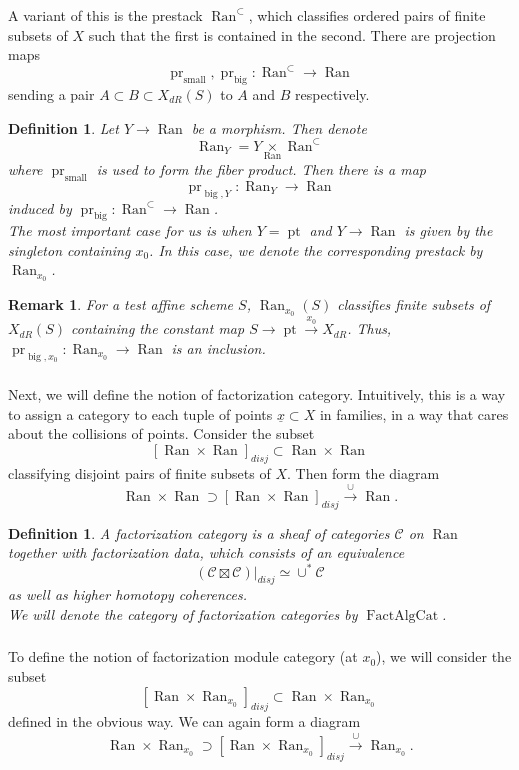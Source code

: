 \documentclass[10pt,a4paper]{amsart}
\newtheorem{defn}[subsubsection]{Definition}
\newtheorem{rem}[subsubsection]{Remark}
\newcommand{\on}[1]{\operatorname{#1}}
\newcommand{\Ran}{\on{Ran}}
\newcommand{\FactAlgCat}{\on{FactAlgCat}}
\newcommand{\sssec}[1]{\subsubsection{}}
\begin{document}
\sssec{}
A variant of this is the prestack $\Ran^{\subset}$, which classifies ordered pairs of finite subsets of $X$ such that the first is contained in the second. There are projection maps
$$
\on{pr}_{\on{small}}, \on{pr}_{\on{big}}: \Ran^{\subset} \longrightarrow \Ran
$$
sending a pair $A \subset B \subset X_{dR}(S)$ to $A$ and $B$ respectively.

\begin{defn}
    Let $Y \to \Ran$ be a morphism. Then denote
    $$
    \Ran_Y = Y \underset{\Ran}{\times} \Ran^{\subset}
    $$
    where $\on{pr}_{\on{small}}$ is used to form the fiber product. Then there is a map
    $$
    \on{pr}_{\on{big}, Y} : \Ran_Y \longrightarrow \Ran
    $$
    induced by $\on{pr}_{\on{big}} : \Ran^{\subset} \to \Ran$.
    \\
    The most important case for us is when $Y = \on{pt}$ and $Y \to \Ran$ is given by the singleton containing $x_0$. In this case, we denote the corresponding prestack by $\Ran_{x_0}$.
\end{defn}

\begin{rem}
    For a test affine scheme $S$, $\Ran_{x_0}(S)$ classifies finite subsets of $X_{dR}(S)$ containing the constant map $S \to \on{pt} \overset{x_0}{\to} X_{dR}$. Thus, $\on{pr}_{\on{big}, x_0} : \Ran_{x_0} \to \Ran$ is an inclusion.
\end{rem}

\sssec{}
Next, we will define the notion of factorization category. Intuitively, this is a way to assign a category to each tuple of points $\underline{x} \subset X$ in families, in a way that cares about the collisions of points. Consider the subset
$$
    [\Ran \times \Ran]_{disj} \subset \Ran \times \Ran
$$
classifying disjoint pairs of finite subsets of $X$. Then form the diagram
$$
\Ran \times \Ran \supset [\Ran \times \Ran]_{disj} \overset{\cup}{\to} \Ran.
$$
\begin{defn}
    A factorization category is a sheaf of categories $\mathcal{C}$ on $\Ran$ together with factorization data, which consists of an equivalence
    $$
        (\mathcal{C} \boxtimes \mathcal{C})|_{disj} \simeq \cup^* \mathcal{C}
    $$
    as well as higher homotopy coherences.
    \\
    We will denote the category of factorization categories by $\FactAlgCat$.
\end{defn}

\sssec{}
To define the notion of factorization module category (at $x_0$), we will consider the subset
$$
    [\Ran \times \Ran_{x_0}]_{disj} \subset \Ran \times \Ran_{x_0}
$$
defined in the obvious way. We can again form a diagram
$$
\Ran \times \Ran_{x_0} \supset [\Ran \times \Ran_{x_0}]_{disj} \overset{\cup}{\to} \Ran_{x_0}.
$$
\end{document}
